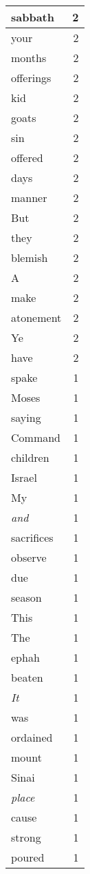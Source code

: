 \begin{center}
\begin{longtable}{l|r}
sabbath & 2\\ \hline 
your & 2\\ \hline 
months & 2\\ \hline 
offerings & 2\\ \hline 
kid & 2\\ \hline 
goats & 2\\ \hline 
sin & 2\\ \hline 
offered & 2\\ \hline 
days & 2\\ \hline 
manner & 2\\ \hline 
But & 2\\ \hline 
they & 2\\ \hline 
blemish & 2\\ \hline 
A & 2\\ \hline 
make & 2\\ \hline 
atonement & 2\\ \hline 
Ye & 2\\ \hline 
have & 2\\ \hline 
spake & 1\\ \hline 
Moses & 1\\ \hline 
saying & 1\\ \hline 
Command & 1\\ \hline 
children & 1\\ \hline 
Israel & 1\\ \hline 
My & 1\\ \hline 
\emph{and} & 1\\ \hline 
sacrifices & 1\\ \hline 
observe & 1\\ \hline 
due & 1\\ \hline 
season & 1\\ \hline 
This & 1\\ \hline 
The & 1\\ \hline 
ephah & 1\\ \hline 
beaten & 1\\ \hline 
\emph{It} & 1\\ \hline 
was & 1\\ \hline 
ordained & 1\\ \hline 
mount & 1\\ \hline 
Sinai & 1\\ \hline 
\emph{place} & 1\\ \hline 
cause & 1\\ \hline 
strong & 1\\ \hline 
poured & 1\\ \hline 

\end{longtable}
\end{center}
